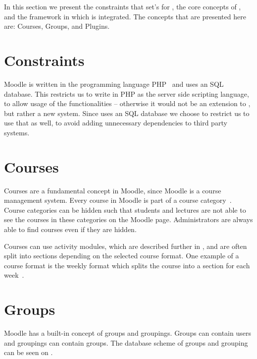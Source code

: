 \label{sec:moodleplatform}
In this section we present the constraints that \moodle{} set's for \system{}, the core concepts of \moodle{}, and the framework in which \system{} is integrated.
The concepts that are presented here are: Courses, Groups, and Plugins.

\section{Constraints}
\label{sub:constraints}
Moodle is written in the programming language PHP~\cite{moodleabout} and uses an SQL database.
This restricts us to write \system{} in PHP as the server side scripting language, to allow usage of the \moodle{} functionalities -- otherwise it would not be an extension to \moodle{}, but rather a new system.
Since \moodle{} uses an SQL database we choose to restrict us to use that as well, to avoid adding unnecessary dependencies to third party systems.


\section{Courses}
\label{sub:courses}
Courses are a fundamental concept in Moodle, since Moodle is a course management system.
Every course in Moodle is part of a course category~\cite{moodlecoursecategories}. 
Course categories can be hidden such that students and lectures are not able to see the courses in these categories on the Moodle page.
Administrators are always able to find courses even if they are hidden.

Courses can use activity modules, which are described further in , and are often split into sections depending on the selected course format.
One example of a course format is the weekly format which splits the course into a section for each week~\cite{moodlecourseformat}.

\section{Groups}
Moodle has a built-in concept of groups and groupings. 
Groups can contain users and groupings can contain groups. 
The database scheme of groups and grouping can be seen on .

